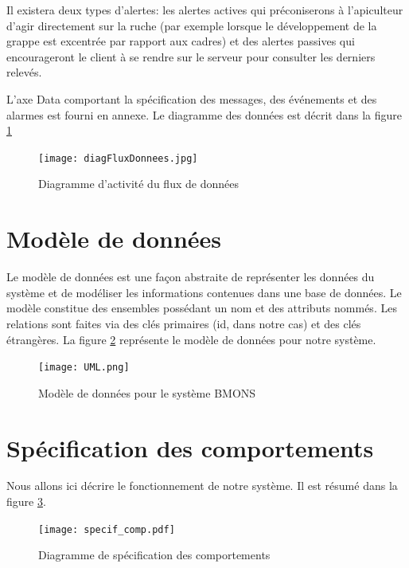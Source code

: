 Il existera deux types d'alertes: les alertes actives qui préconiserons à l'apiculteur d'agir directement sur la ruche (par exemple lorsque le développement de la grappe est excentrée par rapport aux cadres) et des alertes passives qui encourageront le client à se rendre sur le serveur pour consulter les derniers relevés.   

L'axe Data comportant la spécification des messages, des événements et des alarmes est fourni en annexe.
Le diagramme des données est décrit dans la figure \ref{fig:Fluxdonnees} 



\begin{figure}[h!]
\centering\texttt{[image: diagFluxDonnees.jpg]}
\caption{\label{fig:Fluxdonnees} Diagramme d'activité du flux de données}
\end{figure}

\clearpage

\section{Modèle de données}
\vspace{1.5cm}
Le modèle de données est une façon abstraite de représenter les données du système et de modéliser les informations contenues dans une base de données. Le modèle constitue des ensembles possédant un nom et des attributs nommés. Les relations sont faites via des clés primaires (id, dans notre cas) et des clés étrangères.  
La figure \ref{fig:UML} représente le modèle de données pour notre système. 



\begin{figure}[h!]
\centering\texttt{[image: UML.png]}
\caption{\label{fig:UML} Modèle de données pour le système BMONS}
\end{figure}

\clearpage

\section{Spécification des comportements}
\vspace{1.5cm}
Nous allons ici décrire le fonctionnement de notre système. Il est résumé dans la figure \ref{fig:sp_comp}.

\begin{figure}[h!]
\centering\texttt{[image: specif\_comp.pdf]}
\caption{\label{fig:sp_comp} Diagramme de spécification des comportements}
\end{figure}

